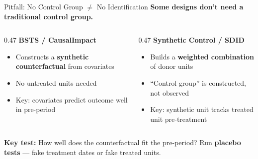 \begin{frame}{Pitfall: No Control Group $\neq$ No Identification}
  \small
  \textbf{Some designs don't need a traditional control group.}

  \vspace{4pt}

  \begin{columns}[T]
    \begin{column}{0.47\textwidth}
      \textbf{BSTS / CausalImpact}
      \begin{itemize}
        \item Constructs a \textbf{synthetic counterfactual} from covariates
        \item No untreated units needed
        \item Key: covariates predict outcome well in pre-period
      \end{itemize}
    \end{column}
    \begin{column}{0.47\textwidth}
      \textbf{Synthetic Control / SDID}
      \begin{itemize}
        \item Builds a \textbf{weighted combination} of donor units
        \item ``Control group'' is constructed, not observed
        \item Key: synthetic unit tracks treated unit pre-treatment
      \end{itemize}
    \end{column}
  \end{columns}

  \vspace{6pt}

  \textbf{Key test:} How well does the counterfactual fit the pre-period? Run \textbf{placebo tests} --- fake treatment dates or fake treated units.
\end{frame}

